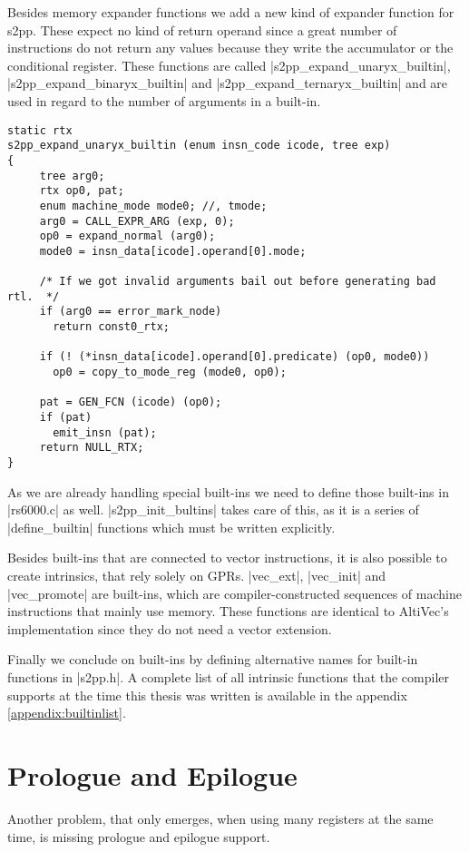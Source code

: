 Besides memory expander functions we add a new kind of expander function for s2pp.
These expect no kind of return operand since a great number of instructions do not return any values because they write the accumulator or the conditional register.
These functions are called |s2pp_expand_unaryx_builtin|, |s2pp_expand_binaryx_builtin| and |s2pp_expand_ternaryx_builtin| and are used in regard to the number of arguments in a built-in.
\begin{lstlisting}
static rtx
s2pp_expand_unaryx_builtin (enum insn_code icode, tree exp)
{
     tree arg0;
     rtx op0, pat;
     enum machine_mode mode0; //, tmode;
     arg0 = CALL_EXPR_ARG (exp, 0);
     op0 = expand_normal (arg0);
     mode0 = insn_data[icode].operand[0].mode;

     /* If we got invalid arguments bail out before generating bad rtl.  */
     if (arg0 == error_mark_node)
       return const0_rtx;

     if (! (*insn_data[icode].operand[0].predicate) (op0, mode0))
       op0 = copy_to_mode_reg (mode0, op0);

     pat = GEN_FCN (icode) (op0);
     if (pat)
       emit_insn (pat);
     return NULL_RTX;
}
\end{lstlisting}

As we are already handling special built-ins we need to define those built-ins in |rs6000.c| as well.
|s2pp_init_bultins| takes care of this, as it is a series of |define_builtin| functions which must be written explicitly.

Besides built-ins that are connected to vector instructions, it is also possible to create intrinsics, that rely solely on GPRs.
|vec_ext|, |vec_init| and |vec_promote| are built-ins, which are compiler-constructed sequences of machine instructions that mainly use memory.
These functions are identical to AltiVec's implementation since they do not need a vector extension.

Finally we conclude on built-ins by defining alternative names for built-in functions in |s2pp.h|.
A complete list of all intrinsic functions that the compiler supports at the time this thesis was written is available in the appendix \ref{appendix:builtinlist}.

\section{Prologue and Epilogue}
Another problem, that only emerges, when using many registers at the same time, is missing prologue and epilogue support.

